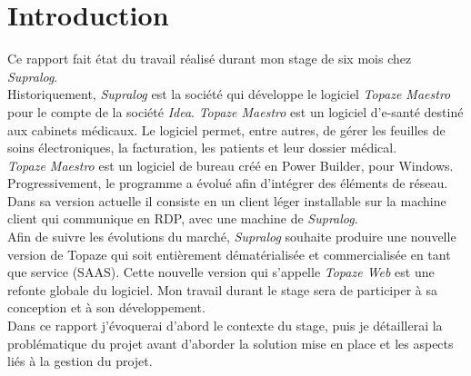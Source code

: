 \newpage
\section{Introduction} %

Ce rapport fait état du travail réalisé durant mon stage de six mois chez \textit{Supralog}.\\

Historiquement, \textit{Supralog} est la société qui développe le logiciel \textit{\gls{Topaze Maestro}} pour le compte de la société \textit{Idea}. \textit{\gls{Topaze Maestro}} est un logiciel d’e-santé destiné aux cabinets médicaux. Le logiciel permet, entre autres, de gérer les feuilles de soins électroniques, la facturation, les patients et leur dossier médical.\\
\textit{Topaze Maestro} est un logiciel de bureau créé en Power Builder, pour Windows. Progressivement, le programme a évolué afin d'intégrer des éléments de réseau. Dans sa version actuelle il consiste en un client léger installable sur la machine client qui communique en RDP, avec une machine de \textit{Supralog}.\\

Afin de suivre les évolutions du marché, \textit{Supralog} souhaite produire une nouvelle version de Topaze qui soit entièrement dématérialisée et commercialisée en tant que service (\gls{SAAS}). Cette nouvelle version qui s’appelle \textit{\gls{Topaze Web}} est une refonte globale du logiciel. Mon travail durant le stage sera de participer à sa conception et à son développement.\\

Dans ce rapport j’évoquerai d’abord le contexte du stage, puis je détaillerai la problématique du projet avant d’aborder la solution mise en place et les aspects liés à la gestion du projet. 

